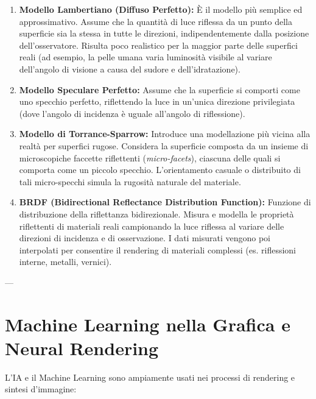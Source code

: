 \begin{enumerate}
    \item \textbf{Modello Lambertiano (Diffuso Perfetto):} È il modello più semplice ed approssimativo. Assume che la quantità di luce riflessa da un punto della superficie sia la stessa in tutte le direzioni, indipendentemente dalla posizione dell'osservatore. Risulta poco realistico per la maggior parte delle superfici reali (ad esempio, la pelle umana varia luminosità visibile al variare dell'angolo di visione a causa del sudore e dell'idratazione).
    \item \textbf{Modello Speculare Perfetto:} Assume che la superficie si comporti come uno specchio perfetto, riflettendo la luce in un'unica direzione privilegiata (dove l'angolo di incidenza è uguale all'angolo di riflessione).
    \item \textbf{Modello di Torrance-Sparrow:} Introduce una modellazione più vicina alla realtà per superfici rugose. Considera la superficie composta da un insieme di microscopiche faccette riflettenti (\textit{micro-facets}), ciascuna delle quali si comporta come un piccolo specchio. L'orientamento casuale o distribuito di tali micro-specchi simula la rugosità naturale del materiale.
    \item \textbf{BRDF (Bidirectional Reflectance Distribution Function):} Funzione di distribuzione della riflettanza bidirezionale. Misura e modella le proprietà riflettenti di materiali reali campionando la luce riflessa al variare delle direzioni di incidenza e di osservazione. I dati misurati vengono poi interpolati per consentire il rendering di materiali complessi (es. riflessioni interne, metalli, vernici).
\end{enumerate}

---

\section{Machine Learning nella Grafica e Neural Rendering}

L'IA e il Machine Learning sono ampiamente usati nei processi di rendering e sintesi d'immagine:

